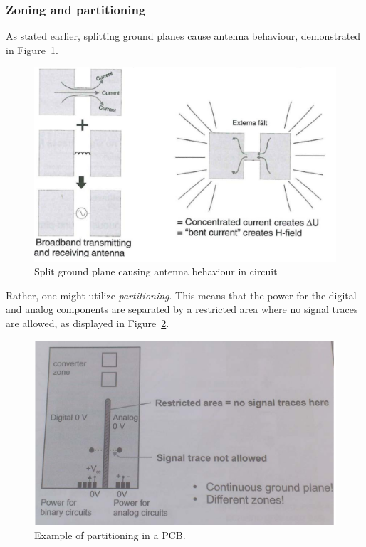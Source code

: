 \subsubsection*{Zoning and partitioning}
As stated earlier, splitting ground planes cause antenna behaviour, demonstrated
in Figure~\ref{fig:splitground}. 
\begin{figure}[H]
    \centering
    \includegraphics[scale=0.3]{./figures/FIG_splitground.png}
    \caption{Split ground plane causing antenna behaviour in circuit}
    \label{fig:splitground}
\end{figure}
Rather, one might utilize \textit{partitioning}. This means that the power for
the digital and analog components are separated by a restricted area where no
signal traces are allowed, as displayed in Figure~\ref{fig:partitioning}.
\begin{figure}[H]
    \centering
    \includegraphics[scale=0.3]{./figures/FIG_partitioning.png}
    \caption{Example of partitioning in a PCB.}
    \label{fig:partitioning}
\end{figure}
